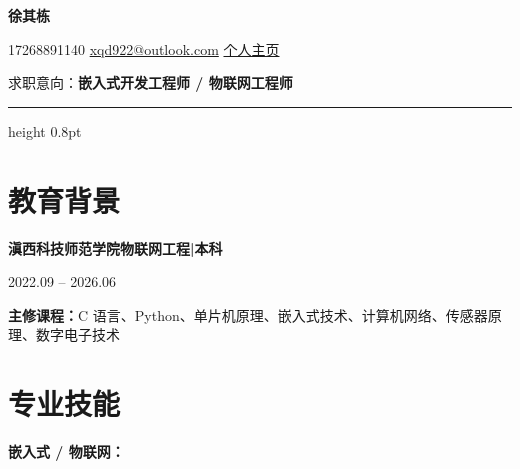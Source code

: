 \documentclass[10pt,a4paper]{article}
\begin{document}
\begin{center}
    {\fontsize{24}{28}\selectfont\bfseries\color{primary} 徐其栋}

    \vspace{0.1em}

    {\color{graytext}
    \faPhone\hspace{0.3em}17268891140
    \hspace{1.2em}
    \faEnvelope\hspace{0.3em}\href{mailto:xqd922@outlook.com}{xqd922@outlook.com}
    \hspace{1.2em}
    \faGlobe\hspace{0.3em}\href{https://1001.pp.ua}{个人主页}}

    \vspace{0.3em}

    {\color{darktext} 求职意向：\textbf{\color{primary}嵌入式开发工程师 / 物联网工程师}}
\end{center}

\vspace{0.2em}
{\color{rulecolor}\hrule height 0.8pt}

\section{\faGraduationCap\hspace{0.4em}教育背景}

{\bfseries 滇西科技师范学院}\hfill{\bfseries 物联网工程\hspace{0.3em}|\hspace{0.3em}本科}

{\color{graytext} 2022.09 -- 2026.06}

\vspace{0.2em}

{\color{darktext}\textbf{主修课程：}C 语言、Python、单片机原理、嵌入式技术、计算机网络、传感器原理、数字电子技术}

\section{\faCogs\hspace{0.4em}专业技能}

{\bfseries\color{primary}嵌入式 / 物联网：}
\end{document}
